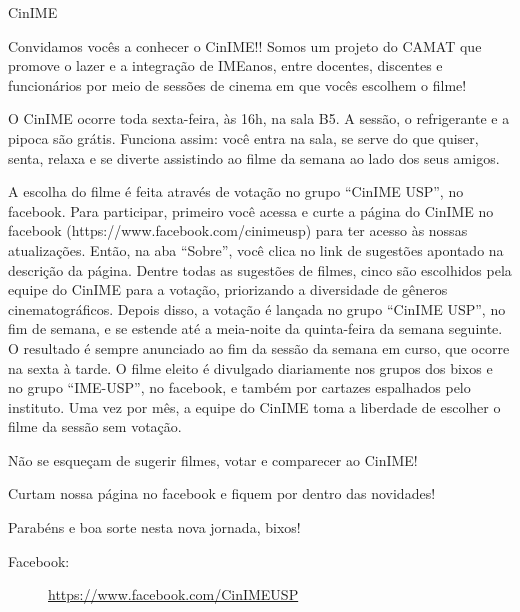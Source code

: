 \begin{subsecao}{CinIME}


Convidamos vocês a conhecer o CinIME!! Somos um projeto do CAMAT que promove o
lazer e a integração de IMEanos, entre docentes, discentes e funcionários por
meio de sessões de cinema em que vocês escolhem o filme!

O CinIME ocorre toda sexta-feira, às 16h, na sala B5. A sessão, o refrigerante
e a pipoca são grátis. Funciona assim: você entra na sala, se serve do que
quiser, senta, relaxa e se diverte assistindo ao filme da semana ao lado dos
seus amigos.

A escolha do filme é feita através de votação no grupo “CinIME USP”, no
facebook. Para participar, primeiro você acessa e curte a página do CinIME no
facebook (https://www.facebook.com/cinimeusp) para ter acesso às nossas
atualizações. Então, na aba “Sobre”, você clica no link de sugestões apontado
na descrição da página. Dentre todas as sugestões de filmes, cinco são
escolhidos pela equipe do CinIME para a votação, priorizando a diversidade de
gêneros cinematográficos. Depois disso, a votação é lançada no grupo “CinIME
USP”, no fim de semana, e se estende até a meia-noite da quinta-feira da semana
seguinte. O resultado é sempre anunciado ao fim da sessão da semana em curso,
que ocorre na sexta à tarde. O filme eleito é divulgado diariamente nos grupos
dos bixos e no grupo “IME-USP”, no facebook, e também por cartazes espalhados
pelo instituto. Uma vez por mês, a equipe do CinIME toma a liberdade de
escolher o filme da sessão sem votação.

Não se esqueçam de sugerir filmes, votar e comparecer ao CinIME!

Curtam nossa página no facebook e fiquem por dentro das novidades!

Parabéns e boa sorte nesta nova jornada, bixos!

\begin{description}
  \item[Facebook:] \url{https://www.facebook.com/CinIMEUSP}
\end{description}

\end{subsecao}

